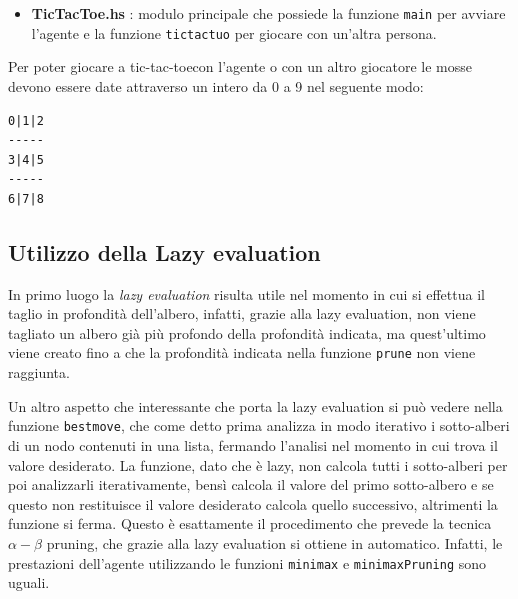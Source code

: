 \documentclass[11pt, a4paper]{article}
\newcommand{\tic}{tic-tac-toe}
\newcommand{\image}[4]{
	\begin{figure}[H]
		\centering
		\texttt{[image: \#2]}
		\caption{#3.}
		\label{#4}
	\end{figure}
}
\begin{document}
\begin{itemize}
\begin{itemize}
		\item \textbf{miniman} : versione dell'algoritmo che risulta essere una semplice traduzione dello pseudo-codice mostrato in Figura~\ref{minimax} e dunque restituisce per ogni nodo dell'albero il valore di utilità del suo sotto-albero;
		\item \textbf{minimaxPruning} : versione modificata della funzione \textit{minimax} che prevede l'utilizzo della tecnica dell'$\alpha-\beta$ pruning;
		\image{0.5}{minimax}{Pseudo-codice dell'algoritmo minimax}{minimax} 
	\end{itemize}
	entrambe queste funzioni vengono chiamate dalla funzione \texttt{bestmove} che ricevendo una lista di nodi col proprio valore di utilità e il \textit{Player} che deve muovere, scorre la lista finché non trova un valore di utilità pari al valore del \textit{Player} dato. La funzione \texttt{bestmove} si occupa anche di limitare la profondità dell'albero grazie alla funzione \textit{prune}, la quale data una profondità ed un albero, "taglia" quest'ultimo alla profondità indicata;
	\item \textbf{TicTacToe.hs} : modulo principale che possiede la funzione \texttt{main} per avviare l'agente e la funzione \texttt{tictactuo} per giocare con un'altra persona.
\end{itemize}

Per poter giocare a \tic con l'agente o con un altro giocatore le mosse devono essere date attraverso un intero da 0 a 9 nel seguente modo:
\begin{lstlisting}
0|1|2
-----
3|4|5
-----
6|7|8
\end{lstlisting}

\subsection{Utilizzo della Lazy evaluation}
In primo luogo la \textit{lazy evaluation} risulta utile nel momento in cui si effettua il taglio in profondità dell'albero, infatti, grazie alla lazy evaluation, non viene tagliato un albero già più profondo della profondità indicata, ma quest'ultimo viene creato fino a che la profondità indicata nella funzione \texttt{prune} non viene raggiunta.

Un altro aspetto che interessante che porta la lazy evaluation si può vedere nella funzione \texttt{bestmove}, che come detto prima analizza in modo iterativo i sotto-alberi di un nodo contenuti in una lista, fermando l'analisi nel momento in cui trova il valore desiderato. La funzione, dato che è lazy, non calcola tutti i sotto-alberi per poi analizzarli iterativamente, bensì calcola il valore del primo sotto-albero e se questo non restituisce il valore desiderato calcola quello successivo, altrimenti la funzione si ferma. Questo è esattamente il procedimento che prevede la tecnica $\alpha-\beta$ pruning, che grazie alla lazy evaluation si ottiene in automatico. Infatti, le prestazioni dell'agente utilizzando le funzioni \texttt{minimax} e \texttt{minimaxPruning} sono uguali.
\end{document}
